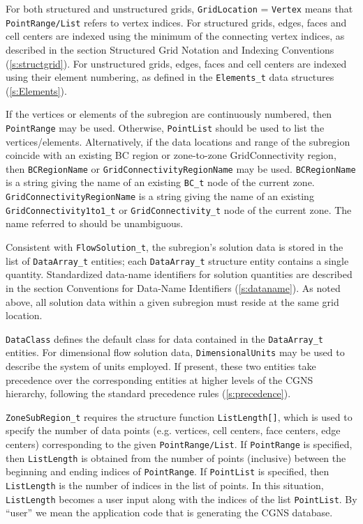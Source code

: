 For both structured and unstructured grids, \texttt{GridLocation} = \texttt{Vertex}
means that \texttt{PointRange/List} refers to vertex indices. For structured grids,
edges, faces and cell centers are indexed using the minimum of the
connecting vertex indices, as described in the section
Structured Grid Notation and Indexing Conventions (\autoref{s:structgrid}).
For unstructured grids, edges, faces and
cell centers are indexed using their element numbering, as defined in
the \texttt{Elements\_t} data structures (\autoref{s:Elements}).

If the vertices or elements of the subregion are continuously numbered,
then \texttt{PointRange} may be used. Otherwise, \texttt{PointList}
should be used to list the vertices/elements. Alternatively, if
the data locations and range of the subregion coincide with an existing
BC region or zone-to-zone GridConnectivity region, then \texttt{BCRegionName}
or \texttt{GridConnectivityRegionName} may be used.
\texttt{BCRegionName} is a string giving the name of an existing
\texttt{BC\_t} node of the current zone.
\texttt{GridConnectivityRegionName} is a string giving the name of an existing
\texttt{GridConnectivity1to1\_t}
or \texttt{GridConnectivity\_t}
node of the current zone.
The name referred to should be unambiguous.

Consistent with \texttt{FlowSolution\_t},
the subregion's solution data is stored in the list of
\texttt{DataArray\_t} entities;
each \texttt{DataArray\_t} structure entity contains a single quantity.
Standardized data-name identifiers for solution quantities are described
in the section Conventions for Data-Name Identifiers (\autoref{s:dataname}).
As noted above, all solution data
within a given subregion must reside at the same grid location.

\texttt{DataClass} defines the default class
for data contained in the \texttt{DataArray\_t} entities. For dimensional
flow solution data, \texttt{DimensionalUnits}
may be used to describe the system of units employed. If present, these two entities
take precedence over the corresponding entities at higher levels of the
CGNS hierarchy, following the standard precedence rules (\autoref{s:precedence}).

\texttt{ZoneSubRegion\_t} requires the structure function
\texttt{ListLength[]},
which is used to specify the number
of data points (e.g. vertices, cell centers, face centers, edge centers)
corresponding to the given \texttt{PointRange/List}.
If \texttt{PointRange} is specified, then \texttt{ListLength} is obtained
from the number of points (inclusive) between the beginning and ending indices
of \texttt{PointRange}. If \texttt{PointList} is specified,
then \texttt{ListLength} is the number of indices in the list of points.
In this situation, \texttt{ListLength} becomes a user input along with the
indices of the list \texttt{PointList}. By ``user'' we mean the application
code that is generating the CGNS database.

